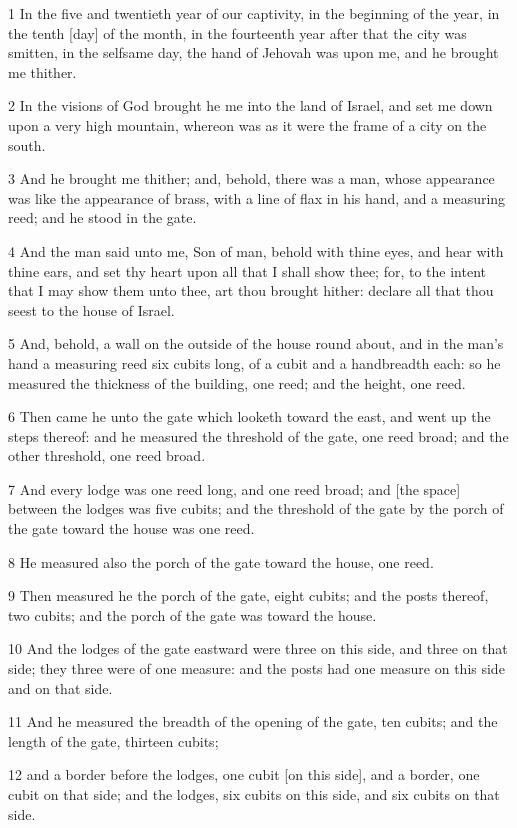 \par 1 In the five and twentieth year of our captivity, in the beginning of the year, in the tenth [day] of the month, in the fourteenth year after that the city was smitten, in the selfsame day, the hand of Jehovah was upon me, and he brought me thither.
\par 2 In the visions of God brought he me into the land of Israel, and set me down upon a very high mountain, whereon was as it were the frame of a city on the south.
\par 3 And he brought me thither; and, behold, there was a man, whose appearance was like the appearance of brass, with a line of flax in his hand, and a measuring reed; and he stood in the gate.
\par 4 And the man said unto me, Son of man, behold with thine eyes, and hear with thine ears, and set thy heart upon all that I shall show thee; for, to the intent that I may show them unto thee, art thou brought hither: declare all that thou seest to the house of Israel.
\par 5 And, behold, a wall on the outside of the house round about, and in the man's hand a measuring reed six cubits long, of a cubit and a handbreadth each: so he measured the thickness of the building, one reed; and the height, one reed.
\par 6 Then came he unto the gate which looketh toward the east, and went up the steps thereof: and he measured the threshold of the gate, one reed broad; and the other threshold, one reed broad.
\par 7 And every lodge was one reed long, and one reed broad; and [the space] between the lodges was five cubits; and the threshold of the gate by the porch of the gate toward the house was one reed.
\par 8 He measured also the porch of the gate toward the house, one reed.
\par 9 Then measured he the porch of the gate, eight cubits; and the posts thereof, two cubits; and the porch of the gate was toward the house.
\par 10 And the lodges of the gate eastward were three on this side, and three on that side; they three were of one measure: and the posts had one measure on this side and on that side.
\par 11 And he measured the breadth of the opening of the gate, ten cubits; and the length of the gate, thirteen cubits;
\par 12 and a border before the lodges, one cubit [on this side], and a border, one cubit on that side; and the lodges, six cubits on this side, and six cubits on that side.
